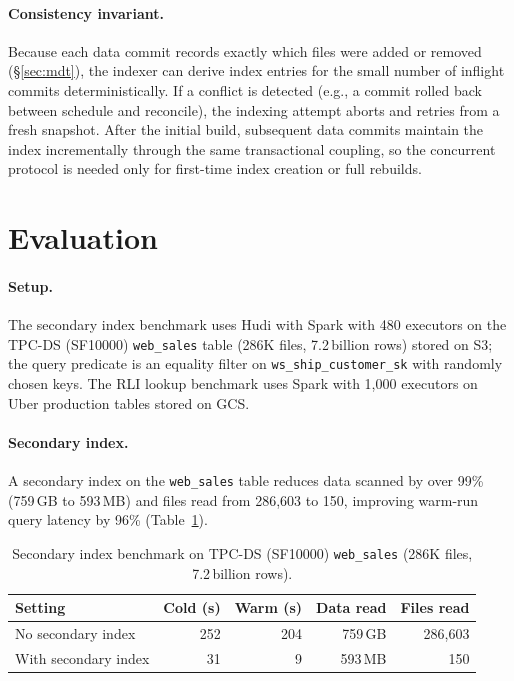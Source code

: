 \documentclass[sigconf]{acmart}
\begin{document}
\paragraph{Consistency invariant.}
Because each data commit records exactly which files were added or removed
(\S\ref{sec:mdt}), the indexer can derive index entries for the small number
of inflight commits deterministically.
If a conflict is detected (e.g., a commit rolled back between schedule and
reconcile), the indexing attempt aborts and retries from a fresh snapshot.
After the initial build, subsequent data commits maintain the index
incrementally through the same transactional coupling, so the concurrent
protocol is needed only for first-time index creation or full rebuilds.

\section{Evaluation}
\label{sec:eval}

\paragraph{Setup.}
The secondary index benchmark uses Hudi with Spark with 480 executors on the TPC-DS (SF10000) \texttt{web\_sales} table (286K files, 7.2\,billion rows) stored on S3; the query predicate is an equality filter on \texttt{ws\_ship\_customer\_sk} with randomly chosen keys.
The RLI lookup benchmark uses Spark with 1,000 executors on Uber production tables stored on GCS.

\paragraph{Secondary index.}
A secondary index on the \texttt{web\_sales} table reduces data scanned by over 99\% (759\,GB to 593\,MB) and files read from 286,603 to 150, improving warm-run query latency by 96\% (Table~\ref{tab:tpcds}).

\begin{table}[t]
\caption{Secondary index benchmark on TPC-DS (SF10000) \texttt{web\_sales} (286K files, 7.2\,billion rows).}
\label{tab:tpcds}
\centering
\small
\begin{tabular}{@{}lrrrr@{}}
\toprule
\textbf{Setting} & \textbf{Cold (s)} & \textbf{Warm (s)} & \textbf{Data read} & \textbf{Files read} \\
\midrule
No secondary index & 252 & 204 & 759\,GB & 286,603 \\
With secondary index & 31 & 9 & 593\,MB & 150 \\
\bottomrule
\end{tabular}
\end{table}
\end{document}
